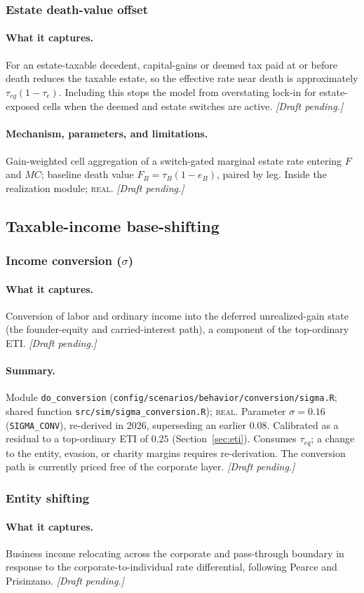 \documentclass[11pt]{article}
\newcommand{\code}[1]{\texttt{\small #1}}
\newcommand{\pending}{\textit{[Draft pending.]}}
\newcommand{\field}[1]{\paragraph{#1.}}
\begin{document}
\subsubsection{Estate death-value offset}
\label{sec:estate-offset}

\field{What it captures}
For an estate-taxable decedent, capital-gains or deemed tax paid at or before
death reduces the taxable estate, so the effective rate near death is
approximately $\tau_{cg}(1-\tau_e)$. Including this stops the model from
overstating lock-in for estate-exposed cells when the deemed and estate switches
are active. \pending

\field{Mechanism, parameters, and limitations}
Gain-weighted cell aggregation of a switch-gated marginal estate rate entering
$F$ and $MC$; baseline death value $F_B=\tau_B(1-e_B)$, paired by leg. Inside
the realization module; \textsc{real}. \pending

\subsection{Taxable-income base-shifting}

\subsubsection{Income conversion ($\sigma$)}
\label{sec:conversion}

\field{What it captures}
Conversion of labor and ordinary income into the deferred unrealized-gain state
(the founder-equity and carried-interest path), a component of the top-ordinary
ETI. \pending

\field{Summary}
Module \code{do_conversion} (\code{config/scenarios/behavior/conversion/sigma.R};
shared function \code{src/sim/sigma_conversion.R}); \textsc{real}. Parameter
$\sigma=0.16$ (\code{SIGMA_CONV}), re-derived in 2026, superseding an earlier
$0.08$. Calibrated as a residual to a top-ordinary ETI of $0.25$
(Section~\ref{sec:eti}). Consumes $\tau_{eq}$; a change to the entity, evasion,
or charity margins requires re-derivation. The conversion path is currently
priced free of the corporate layer. \pending

\subsubsection{Entity shifting}
\label{sec:entity}

\field{What it captures}
Business income relocating across the corporate and pass-through boundary in
response to the corporate-to-individual rate differential, following Pearce and
Prisinzano. \pending
\end{document}
